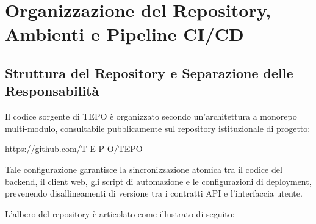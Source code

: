 \section{Organizzazione del Repository, Ambienti e Pipeline CI/CD}
\label{sec:repository_pipeline}

\subsection{Struttura del Repository e Separazione delle Responsabilità}
Il codice sorgente di TEPO è organizzato secondo un'architettura a monorepo multi-modulo, consultabile pubblicamente sul repository istituzionale di progetto:
\begin{center}
    \url{https://github.com/T-E-P-O/TEPO}
\end{center}
Tale configurazione garantisce la sincronizzazione atomica tra il codice del backend, il client web, gli script di automazione e le configurazioni di deployment, prevenendo disallineamenti di versione tra i contratti API e l'interfaccia utente.

L'albero del repository è articolato come illustrato di seguito:

